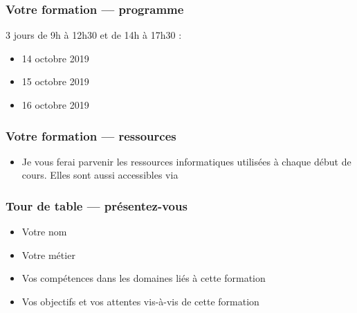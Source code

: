 \documentclass{formation}
\begin{document}
\begin{frame}
  \frametitle{Votre formation — programme}
  3 jours de 9h à 12h30 et de 14h à 17h30 :
  \begin{itemize}
  \item 14 octobre 2019
  \item 15 octobre 2019
  \item 16 octobre 2019
  \end{itemize}
\end{frame}

\begin{frame}
  \frametitle{Votre formation — ressources}
  \begin{itemize}
    \item Je vous ferai parvenir les ressources informatiques utilisées à chaque début de cours. Elles sont aussi accessibles via 
  \end{itemize}
\end{frame}

\begin{frame}
  \frametitle{Tour de table — présentez-vous}
  \begin{itemize}
  \item Votre nom
  \item Votre métier
  \item Vos compétences dans les domaines liés à cette formation
  \item Vos objectifs et vos attentes vis-à-vis de cette formation
  \end{itemize}
\end{frame}
\end{document}
